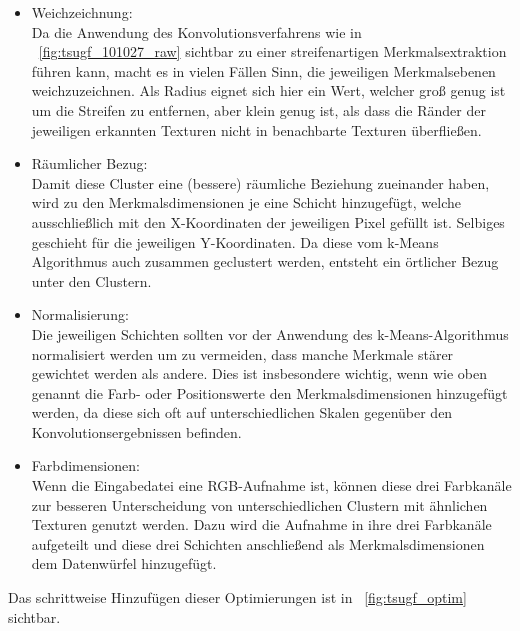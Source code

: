 \begin{itemize}
	\item Weichzeichnung:\\
Da die Anwendung des Konvolutionsverfahrens wie in \figurename~\ref{fig:tsugf_101027_raw} sichtbar zu einer streifenartigen Merkmalsextraktion führen kann, macht es in vielen Fällen Sinn, die jeweiligen Merkmalsebenen weichzuzeichnen. Als Radius eignet sich hier ein Wert, welcher groß genug ist um die Streifen zu entfernen, aber klein genug ist, als dass die Ränder der jeweiligen erkannten Texturen nicht in benachbarte Texturen überfließen.
	\item Räumlicher Bezug:\\
Damit diese Cluster eine (bessere) räumliche Beziehung zueinander haben, wird zu den Merkmalsdimensionen je eine Schicht hinzugefügt, welche ausschließlich mit den X-Koordinaten der jeweiligen Pixel gefüllt ist. Selbiges geschieht für die jeweiligen Y-Koordinaten. Da diese vom k-Means Algorithmus auch zusammen geclustert werden, entsteht ein örtlicher Bezug unter den Clustern.
	\item Normalisierung:\\
Die jeweiligen Schichten sollten vor der Anwendung des k-Means-Algorithmus normalisiert werden um zu vermeiden, dass manche Merkmale stärer gewichtet werden als andere. Dies ist insbesondere wichtig, wenn wie oben genannt die Farb- oder Positionswerte den Merkmalsdimensionen hinzugefügt werden, da diese sich oft auf unterschiedlichen Skalen gegenüber den Konvolutionsergebnissen befinden.
	\item Farbdimensionen:\\
Wenn die Eingabedatei eine RGB-Aufnahme ist, können diese drei Farbkanäle zur besseren Unterscheidung von unterschiedlichen Clustern mit ähnlichen Texturen genutzt werden. Dazu wird die Aufnahme in ihre drei Farbkanäle aufgeteilt und diese drei Schichten anschließend als Merkmalsdimensionen dem Datenwürfel hinzugefügt.
\end{itemize}

Das schrittweise Hinzufügen dieser Optimierungen ist in \figurename~\ref{fig:tsugf_optim} sichtbar.

